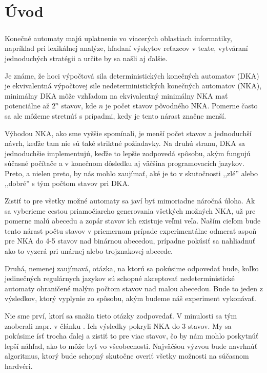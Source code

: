 \chapter{Úvod}
\paragraph{}
Konečné automaty majú uplatnenie vo viacerých oblastiach informatiky, napríklad pri lexikálnej analýze, hľadaní výskytov reťazcov v texte, vytváraní jednoduchých stratégii a určite by sa našli aj ďalšie.

Je známe, že hoci výpočtová sila deterministických konečných automatov (DKA) je ekvivalentná výpočtovej sile nedeterministických konečných automatov (NKA), minimálny DKA môže vzhľadom na ekvivalentný minimálny NKA mať potenciálne až $2^n$ stavov, kde $n$ je počet stavov pôvodného NKA. Pomerne často sa ale môžeme stretnúť s prípadmi, kedy je tento nárast značne menší.

Výhodou NKA, ako sme vyššie spomínali, je menší počet stavov a jednoduchší návrh, keďže tam nie sú také striktné požiadavky. Na druhú stranu, DKA sa jednoduchšie implementujú, keďže to lepšie zodpovedá spôsobu, akým fungujú súčasné počítače a v konečnom dôsledku aj väčšina programovacích jazykov. Preto, a nielen preto, by nás mohlo zaujímať, aké je to v skutočnosti ,,zlé'' alebo ,,dobré'' s tým počtom stavov pri DKA. 

Zistiť to pre všetky možné automaty sa javí byť mimoriadne náročná úloha. Ak sa vyberieme cestou priamočiareho generovania všetkých možných NKA, už pre pomerne malú abecedu a zopár stavov ich existuje veľmi veľa. Naším cieľom bude tento nárast počtu stavov v priemernom prípade experimentálne odmerať aspoň pre NKA do 4-5 stavov nad binárnou abecedou, prípadne pokúsiť sa nahliadnuť ako to vyzerá pri unárnej alebo trojznakovej abecede.

Druhá, nemenej zaujímavá, otázka, na ktorú sa pokúsime odpovedať bude, koľko jedinečných regulárnych jazykov sú schopné akceptovať nedeterministické automaty ohraničené malým počtom stavov nad malou abecedou. Bude to jeden z výsledkov, ktorý vyplynie zo spôsobu, akým budeme náš experiment vykonávať.

Nie sme prví, ktorí sa snažia tieto otázky zodpovedať. V minulosti sa tým zaoberali napr. v článku \cite{shallit}. Ich výsledky pokryli NKA do 3 stavov. My sa pokúsime ísť trocha ďalej a zistiť to pre viac stavov, čo by nám mohlo poskytnúť lepší náhľad, ako to môže byť vo všeobecnosti. Najväčšou výzvou bude navrhnúť algoritmus, ktorý bude schopný skutočne overiť všetky možnosti na súčasnom hardvéri.


